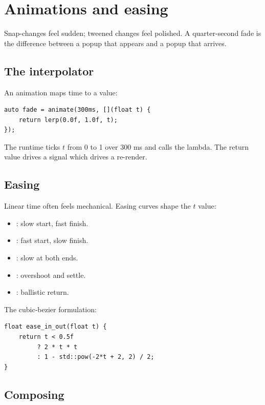 \chapter{Animations and easing}
\label{ch:animations}

\begin{aside}
Snap-changes feel sudden; tweened changes feel polished. A
quarter-second fade is the difference between a popup that
appears and a popup that arrives.
\end{aside}

\section{The interpolator}

An animation maps time to a value:

\begin{lstlisting}
auto fade = animate(300ms, [](float t) {
    return lerp(0.0f, 1.0f, t);
});
\end{lstlisting}

The runtime ticks $t$ from 0 to 1 over 300 ms and calls the
lambda. The return value drives a signal which drives a
re-render.

\section{Easing}

Linear time often feels mechanical. Easing curves shape the
$t$ value:

\begin{itemize}[leftmargin=*]
  \item {}: slow start, fast finish.
  \item {}: fast start, slow finish.
  \item {}: slow at both ends.
  \item {}: overshoot and settle.
  \item {}: ballistic return.
\end{itemize}

The cubic-bezier formulation:

\begin{lstlisting}
float ease_in_out(float t) {
    return t < 0.5f
         ? 2 * t * t
         : 1 - std::pow(-2*t + 2, 2) / 2;
}
\end{lstlisting}

\section{Composing}

